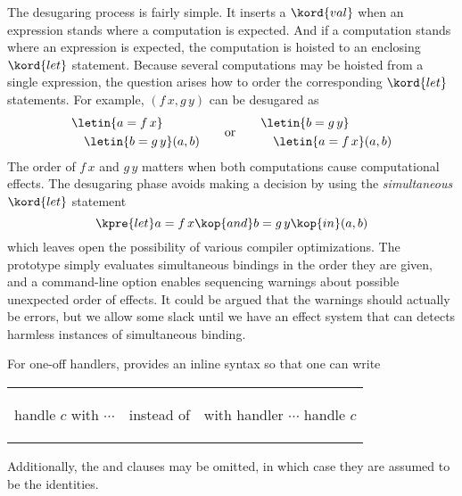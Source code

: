 The desugaring process is fairly simple. It inserts a $\kord{val}$ when an expression
stands where a computation is expected. And if a computation stands where an expression is expected, the computation is hoisted to an enclosing $\kord{let}$
statement. Because several computations may be hoisted from a single expression, the
question arises how to order the corresponding $\kord{let}$ statements. For example, $(f\, x, g\, y)$ can be desugared as
%
\begin{equation*}
  \begin{aligned}
    &\letin{a = f \, x} \\ &\quad \letin{b = g \, y} (a, b)
  \end{aligned}
  \qquad\text{or}\qquad
  \begin{aligned}
    &\letin{b = g \, y} \\ &\quad \letin{a = f \, x} (a, b)
  \end{aligned}
\end{equation*}
%
The order of $f \, x$ and $g \, y$ matters when both computations cause computational
effects. The desugaring phase avoids making a decision by using the \emph{simultaneous}
$\kord{let}$ statement
%
\begin{equation*}
  \kpre{let} a = f \, x \kop{and} b = g \, y \kop{in} (a, b)
\end{equation*}
%
which leaves open the possibility of various compiler optimizations. The prototype simply
evaluates simultaneous bindings in the order they are given, and a command-line
option enables sequencing warnings about possible unexpected order of effects.
%
It could be argued that the warnings should actually be errors, but we allow some slack until
we have an effect system that can detects harmless instances of simultaneous binding.

For one-off handlers, \eff provides an inline syntax so that one can write

\begin{center}
\begin{tabular}{ccc}
\begin{source}
handle
  $c$
with
  $\cdots$
\end{source}&
\quad instead of \quad \hbox{}&
\begin{source}
with
  handler
    $\cdots$
handle
  $c$
\end{source}
\end{tabular}
\end{center}
%
Additionally, the  and  clauses may be omitted, in which case
they are assumed to be the identities.

